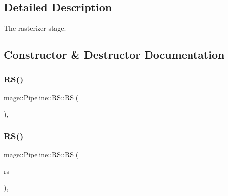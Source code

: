 \subsection{Detailed Description}
The rasterizer stage. 

\subsection{Constructor \& Destructor Documentation}
\hypertarget{structmage_1_1_pipeline_1_1_r_s_a5d2920325973d503fee6137b45835503}{}\label{structmage_1_1_pipeline_1_1_r_s_a5d2920325973d503fee6137b45835503} 
\subsubsection{\texorpdfstring{R\+S()}{RS()}\hspace{0.1cm}{\footnotesize\ttfamily [1/3]}}
{\footnotesize\ttfamily mage\+::\+Pipeline\+::\+R\+S\+::\+RS (\begin{DoxyParamCaption}{ }\end{DoxyParamCaption})\hspace{0.3cm}{\ttfamily [private]}, {\ttfamily [delete]}}

\hypertarget{structmage_1_1_pipeline_1_1_r_s_a264dbb8473ad4a286112aa525e2a3018}{}\label{structmage_1_1_pipeline_1_1_r_s_a264dbb8473ad4a286112aa525e2a3018} 
\subsubsection{\texorpdfstring{R\+S()}{RS()}\hspace{0.1cm}{\footnotesize\ttfamily [2/3]}}
{\footnotesize\ttfamily mage\+::\+Pipeline\+::\+R\+S\+::\+RS (\begin{DoxyParamCaption}\item[{const \hyperlink{structmage_1_1_pipeline_1_1_r_s}{RS} \&}]{rs }\end{DoxyParamCaption})\hspace{0.3cm}{\ttfamily [private]}, {\ttfamily [delete]}}

\hypertarget{structmage_1_1_pipeline_1_1_r_s_a5aca2e871b4a7133bb49b98f28a2ef9e}{}\label{structmage_1_1_pipeline_1_1_r_s_a5aca2e871b4a7133bb49b98f28a2ef9e} 
